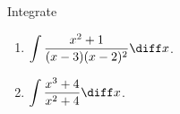 Integrate 
\begin{multicols}{2}
\begin{enumerate}
\item $\displaystyle \int \frac{x^2+1}{(x-3)(x-2)^2}\diff x$.

\item $\displaystyle  \int \frac{x^3+4}{x^2+4}\diff x$.

\end{enumerate}
\end{multicols}